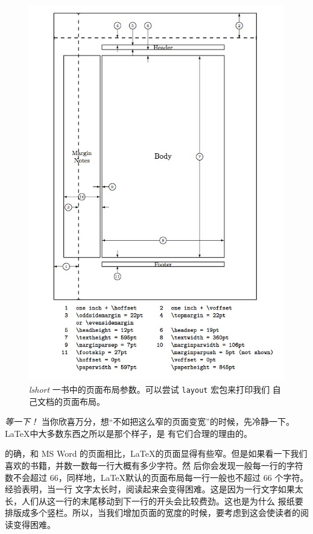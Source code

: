 \documentclass[UTF8]{ctexart}
\begin{document}
\begin{figure}[!tbp]  %
    \centering
    \includegraphics[scale=0.6]{layout.jpg}
    \caption{\kaishu \emph{lshort} 一书中的页面布局参数。可以尝试 \texttt{layout} 宏包来打印我们
    自己文档的页面布局。}
    \label{fig:layout}
\end{figure}

\emph{等一下！} 当你欣喜万分，想“不如把这么窄的页面变宽”的时候，先冷静一下。\LaTeX 中大多数东西之所以是那个样子，是
有它们合理的理由的。

的确，和 MS Word 的页面相比，\LaTeX 的页面显得有些窄。但是如果看一下我们喜欢的书籍，并数一数每一行大概有多少字符。然
后你会发现一般每一行的字符数不会超过 66，同样地，\LaTeX 默认的页面布局每一行一般也不超过 66 个字符。经验表明，当一行
文字太长时，阅读起来会变得困难。这是因为一行文字如果太长，人们从这一行的末尾移动到下一行的开头会比较费劲。这也是为什么
报纸要排版成多个竖栏。所以，当我们增加页面的宽度的时候，要考虑到这会使读者的阅读变得困难。
\end{document}
